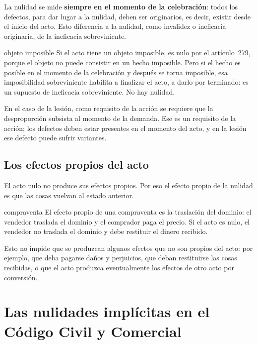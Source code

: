 \documentclass[12pt,oneside]{book}
\begin{document}
\begin{important}
La nulidad se mide \textbf{siempre en el momento de la celebración}: todos los defectos, para dar lugar a la nulidad, deben ser originarios, es decir, existir desde el inicio del acto. Esto diferencia a la nulidad, como invalidez o ineficacia originaria, de la ineficacia sobreviniente.
\end{important}

\begin{example}{objeto imposible}
Si el acto tiene un objeto imposible, es nulo por el artículo~279, porque el objeto no puede consistir en un hecho imposible. Pero si el hecho es posible en el momento de la celebración y después se torna imposible, esa imposibilidad sobreviniente habilita a finalizar el acto, a darlo por terminado: es un supuesto de ineficacia sobreviniente. No hay nulidad.
\end{example}

En el caso de la lesión, como requisito de la acción se requiere que la desproporción subsista al momento de la demanda. Ese es un requisito de la acción; los defectos deben estar presentes en el momento del acto, y en la lesión ese defecto puede sufrir variantes.

\subsection*{Los efectos propios del acto}

El acto nulo no produce sus efectos propios. Por eso el efecto propio de la nulidad es que las cosas vuelvan al estado anterior.

\begin{example}{compraventa}
El efecto propio de una compraventa es la traslación del dominio: el vendedor traslada el dominio y el comprador paga el precio. Si el acto es nulo, el vendedor no traslada el dominio y debe restituir el dinero recibido.
\end{example}

Esto no impide que se produzcan algunos efectos que no son propios del acto: por ejemplo, que deba pagarse daños y perjuicios, que deban restituirse las cosas recibidas, o que el acto produzca eventualmente los efectos de otro acto por conversión.

\section{Las nulidades implícitas en el Código Civil y Comercial}
\label{sec:implicitas}
\end{document}
